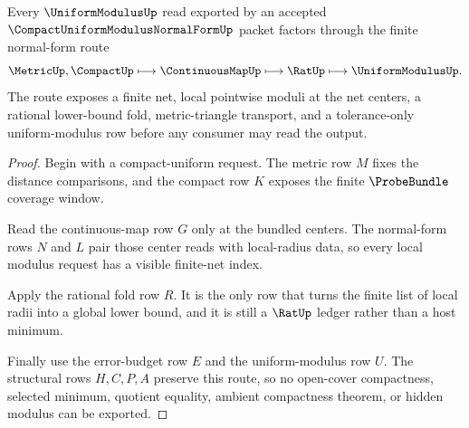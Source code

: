\begin{theorem}
\label{thm:compact-uniform-modulus-normal-form-exhaustion}
Every $\UniformModulusUp$ read exported by an accepted $\CompactUniformModulusNormalFormUp$ packet factors through the finite normal-form route
$$
\MetricUp,\CompactUp \longmapsto
\ContinuousMapUp \longmapsto
\RatUp \longmapsto
\UniformModulusUp .
$$
The route exposes a finite net, local pointwise moduli at the net centers, a rational lower-bound fold, metric-triangle transport, and a tolerance-only uniform-modulus row before any consumer may read the output.
\end{theorem}
\begin{proof}
Begin with a compact-uniform request. The metric row $M$ fixes the distance comparisons, and the compact row $K$ exposes the finite $\ProbeBundle$ coverage window.

Read the continuous-map row $G$ only at the bundled centers. The normal-form rows $N$ and $L$ pair those center reads with local-radius data, so every local modulus request has a visible finite-net index.

Apply the rational fold row $R$. It is the only row that turns the finite list of local radii into a global lower bound, and it is still a $\RatUp$ ledger rather than a host minimum.

Finally use the error-budget row $E$ and the uniform-modulus row $U$. The structural rows $H,C,P,A$ preserve this route, so no open-cover compactness, selected minimum, quotient equality, ambient compactness theorem, or hidden modulus can be exported.
\end{proof}




